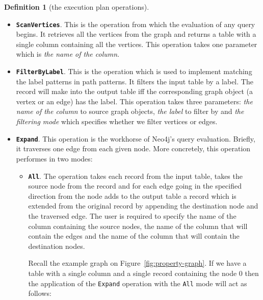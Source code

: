 \documentclass[14pt]{constructor-thesis}
\theoremstyle{definition}
\newtheorem{definition}{Definition}
\begin{document}
\begin{definition}[the execution plan operations] $ $
  \begin{itemize}
    \item \textbf{\texttt{ScanVertices}}. This is the operation from which the evaluation of any query begins. It retrieves all the vertices from the graph and returns a table with a single column containing all the vertices. This operation takes one parameter which is \textit{the name of the column}. 

    \item \textbf{\texttt{FilterByLabel}}. This is the operation which is used to implement matching the label patterns in path patterns.
    It filters the input table by a label. The record will make into the output table iff the corresponding graph object (a vertex or an edge) has the label. This operation takes three parameters: \textit{the name of the column} to source graph objects, \textit{the label} to filter by and \textit{the filtering mode} which specifies whether we filter vertices or edges.

    \item \textbf{\texttt{Expand}}. This operation is the workhorse of Neo4j's query evaluation. Briefly, it traverses one edge from each given node. More concretely, this operation performes in two modes:
    \begin{itemize}
      \item \textbf{\texttt{All}}.
      The operation takes each record from the input table, takes the source node from the record and for each edge going in the specified direction from the node adds to the output table a record which is extended from the original record by appending the destination node and the traversed edge. The user is required to specify the name of the column containing the source nodes, the name of the column that will contain the edges and the name of the column that will contain the destination nodes.

      Recall the example graph on Figure~\ref{fig:property-graph}. If we have a table with a single column and a single record containing the node 0 then the application of the \texttt{Expand} operation with the \texttt{All} mode will act as follows:


\end{itemize}
\end{itemize}
\end{definition}
\end{document}
